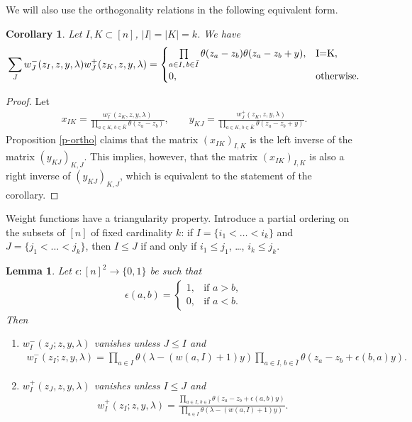 \documentclass[10pt,a4paper]{amsart}
\numberwithin{equation}{section}
\newtheorem{Corollary}[Theorem]{Corollary}
\newtheorem{Lemma}[Theorem]{Lemma}
\begin{document}
We will also use the orthogonality relations in the following equivalent form.
\begin{Corollary} \label{p-ortho2} Let $I,K\subset [n]$, $|I|=|K|=k$. We have
\begin{gather*}
\sum_J w^-_J(z_I,z,y,\lambda) w_J^+(z_K,z,y,\lambda)=
\begin{cases} \prod\limits_{a\in I,\,b\in\bar I}\theta(z_a-z_b)\theta(z_a-z_b+y),& $I=K$,\\
0,& \text{otherwise}.
\end{cases}
\end{gather*}
\end{Corollary}
\begin{proof}Let
\begin{gather*}
x_{IK} =\frac{w^-_I(z_K,z,y,\lambda)}{\prod\limits_{a\in K, \, b\in \bar{K}} \theta(z_a-z_b)}, \qquad
y_{KJ} =\frac{w^+_J(z_K,z,y,\lambda)}{\prod\limits_{a\in K, \, b\in \bar{K}} \theta(z_a-z_b+y)}.
\end{gather*}
Proposition \ref{p-ortho} claims that the matrix $(x_{IK})_{I,K}$ is the left inverse of the matrix $(y_{KJ})_{K,J}$. This implies, however, that the matrix $(x_{IK})_{I,K}$ is also a right inverse of $(y_{KJ})_{K,J}$, which is equivalent to the statement of the corollary.
 \end{proof}

Weight functions have a triangularity property. Introduce a partial ordering on the subsets of $[n]$ of fixed cardinality $k$: if $I=\{i_1<\dots<i_k\}$ and $J=\{j_1<\dots<j_k\}$, then $I\leq J$ if and only if $i_1\leq j_1$, \dots, $i_k\leq j_k$.
\begin{Lemma}\label{lemma-5} Let $\epsilon\colon[n]^2\to\{0,1\}$ be such that
 \begin{gather*}
 \epsilon(a,b)=\begin{cases}1,&\text{if $a>b$},\\
 0,&\text{if $a<b$.}
 \end{cases}
 \end{gather*}
 Then
 \begin{enumerate}\itemsep=0pt
 \item[$(i)$] $w_I^-(z_J;z,y,\lambda)$ vanishes unless $J\leq I$ and
 \begin{gather*}
 w_I^-(z_I;z,y,\lambda)=\prod_{a\in I}\theta(\lambda-(w(a,I)+1)y)\prod_{a\in I,\, b\in \bar I}\theta(z_a-z_b+\epsilon(b,a)y).
 \end{gather*}
 \item[$(ii)$] $w_I^+(z_J,z,y,\lambda)$ vanishes unless $I\leq J$ and
 \begin{gather*}
 w_I^+(z_I;z,y,\lambda)=\frac {\prod\limits_{a\in I,\,b\in \bar I}\theta(z_a-z_b+\epsilon(a,b)y)} {\prod\limits_{a\in I}\theta(\lambda-(w(a,I)+1)y)}.
 \end{gather*}
 \end{enumerate}
\end{Lemma}
\end{document}
